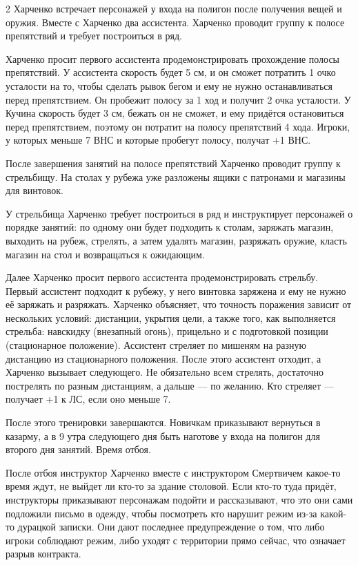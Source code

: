 \documentclass[twoside]{article}
\begin{document}
\begin{multicols}{2}
Харченко встречает персонажей у входа на полигон после получения вещей и
оружия. Вместе с Харченко два ассистента. Харченко проводит группу к
полосе препятствий и требует построиться в ряд.

Харченко просит первого ассистента продемонстрировать прохождение полосы
препятствий. У ассистента скорость будет 5 см, и он сможет потратить 1
очко усталости на то, чтобы сделать рывок бегом и ему не нужно
останавливаться перед препятствием. Он пробежит полосу за 1 ход и
получит 2 очка усталости. У Кучина скорость будет 3 см, бежать он не
сможет, и ему придётся остановиться перед препятствием, поэтому он
потратит на полосу препятствий 4 хода. Игроки, у которых меньше 7 ВНС и
которые пробегут полосу, получат +1 ВНС.

После завершения занятий на полосе препятствий Харченко проводит группу
к стрельбищу. На столах у рубежа уже разложены ящики с патронами и
магазины для винтовок.

У стрельбища Харченко требует построиться в ряд и инструктирует
персонажей о порядке занятий: по одному они будет подходить к столам,
заряжать магазин, выходить на рубеж, стрелять, а затем удалять магазин,
разряжать оружие, класть магазин на стол и возвращаться к ожидающим.

Далее Харченко просит первого ассистента продемонстрировать стрельбу.
Первый ассистент подходит к рубежу, у него винтовка заряжена и ему не
нужно её заряжать и разряжать. Харченко объясняет, что точность
поражения зависит от нескольких условий: дистанции, укрытия цели, а
также того, как выполняется стрельба: навскидку (внезапный огонь),
прицельно и с подготовкой позиции (стационарное положение). Ассистент
стреляет по мишеням на разную дистанцию из стационарного положения.
После этого ассистент отходит, а Харченко вызывает следующего. Не
обязательно всем стрелять, достаточно пострелять по разным дистанциям, а
дальше --- по желанию. Кто стреляет --- получает +1 к ЛС, если оно меньше 7.

После этого тренировки завершаются. Новичкам приказывают вернуться в
казарму, а в 9 утра следующего дня быть наготове у входа на полигон для
второго дня занятий. Время отбоя.

После отбоя инструктор Харченко вместе с инструктором Смертвичем
какое-то время ждут, не выйдет ли кто-то за здание столовой. Если кто-то
туда придёт, инструкторы приказывают персонажам подойти и рассказывают,
что это они сами подложили письмо в одежду, чтобы посмотреть кто нарушит
режим из-за какой-то дурацкой записки. Они дают последнее предупреждение
о том, что либо игроки соблюдают режим, либо уходят с территории прямо
сейчас, что означает разрыв контракта.


\end{multicols}
\end{document}
